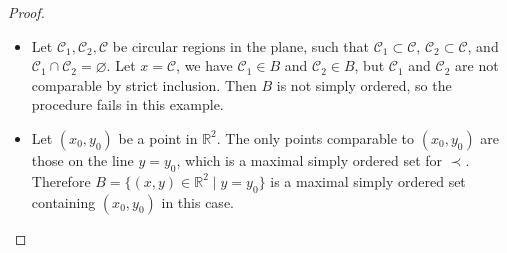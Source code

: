 \documentclass[11pt,a4paper,twoside]{article}
\theoremstyle{definition}
\theoremstyle{plain}
\begin{document}
\begin{proof}\hfill

  \begin{itemize}

  \item Let $\mathscr{C}_1, \mathscr{C}_2, \mathscr{C}$ be circular regions in the plane, such that $\mathscr{C}_1 \subset \mathscr{C}$,
    $\mathscr{C}_2 \subset \mathscr{C}$, and $\mathscr{C}_1 \cap \mathscr{C}_2 = \varnothing$. Let $x = \mathscr{C}$, we have
    $\mathscr{C}_1 \in B$ and $\mathscr{C}_2 \in B$, but $\mathscr{C}_1$ and $\mathscr{C}_2$ are not comparable by strict inclusion.
    Then $B$ is not simply ordered, so the procedure fails in this example.

  \item Let $( x_0, y_0 )$ be a point in $\mathbb{R}^2$. The only points comparable to $( x_0, y_0 )$ are those on the line
    $y = y_0$, which is a maximal simply ordered set for $\prec$. Therefore $B = \{ ( x, y ) \in \mathbb{R}^2 \mid y = y_0 \}$ is
    a maximal simply ordered set containing $( x_0, y_0 )$ in this case.

  \end{itemize}

\end{proof}
\end{document}
